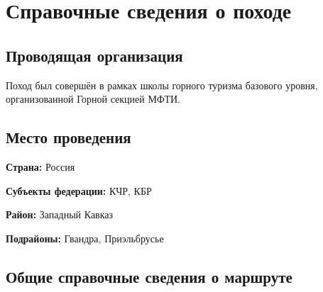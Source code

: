 \section{Справочные сведения о походе} 
\subsection{Проводящая организация}
Поход был совершён в рамках школы горного туризма базового уровня, организованной Горной секцией МФТИ.


\subsection{Место проведения}
\textbf{Страна:} Россия

\textbf{Субъекты федерации:} КЧР, КБР

\textbf{Район:} Западный Кавказ

\textbf{Подрайоны:} Гвандра, Приэльбрусье

\subsection{Общие справочные сведения о маршруте}

